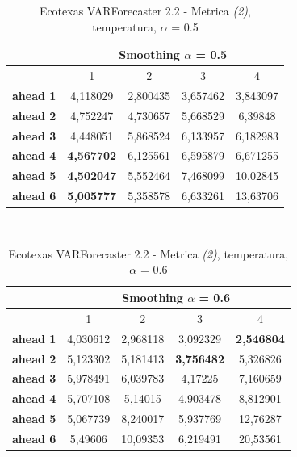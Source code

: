 \documentclass[12pt,a4paper,oneside,openright]{book}
\begin{document}
\medskip

\begin{table}[H]
\centering
\begin{tabular}{|c|c|c|c|c|}
\hline
 & \multicolumn{4}{|c|}{Smoothing $\alpha$ = 0.5} \\
\hline
& 1 & 2 & 3 & 4 \\
\hline
\textbf{ahead 1} & 4,118029 & 2,800435 & 3,657462 & 3,843097\\
\hline
\textbf{ahead 2} & 4,752247 & 4,730657 & 5,668529 & 6,39848\\ 
\hline
\textbf{ahead 3} & 4,448051 & 5,868524 & 6,133957 & 6,182983\\
\hline
\textbf{ahead 4} & \textbf{4,567702} & 6,125561 & 6,595879 & 6,671255\\ 
\hline
\textbf{ahead 5} & \textbf{4,502047} & 5,552464 & 7,468099 & 10,02845\\
\hline
\textbf{ahead 6} & \textbf{5,005777} & 5,358578 & 6,633261 & 13,63706\\ 
\hline
\end{tabular} \\
\caption{Ecotexas VARForecaster 2.2 - Metrica \textit{(2)}, temperatura, $\alpha$ = 0.5}
\end{table} 

\medskip

\begin{table}[H]
\centering
\begin{tabular}{|c|c|c|c|c|}
\hline
 & \multicolumn{4}{|c|}{Smoothing $\alpha$ = 0.6} \\
\hline
& 1 & 2 & 3 & 4 \\
\hline
\textbf{ahead 1} & 4,030612 & 2,968118 & 3,092329 & \textbf{2,546804}\\
\hline
\textbf{ahead 2} & 5,123302 & 5,181413 & \textbf{3,756482} & 5,326826\\ 
\hline
\textbf{ahead 3} & 5,978491 & 6,039783 & 4,17225 & 7,160659\\
\hline
\textbf{ahead 4} & 5,707108 & 5,14015 & 4,903478 & 8,812901\\ 
\hline
\textbf{ahead 5} & 5,067739 & 8,240017 & 5,937769 & 12,76287\\
\hline
\textbf{ahead 6} & 5,49606 & 10,09353 & 6,219491 & 20,53561\\ 
\hline
\end{tabular} \\
\caption{Ecotexas VARForecaster 2.2 - Metrica \textit{(2)}, temperatura, $\alpha$ = 0.6}
\end{table} 
\end{document}

